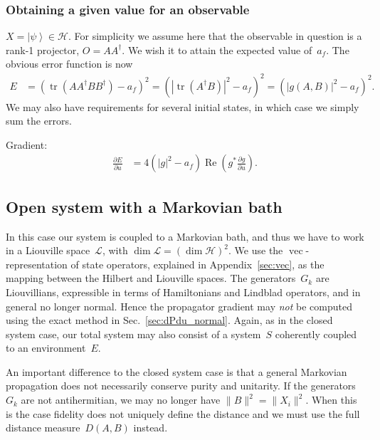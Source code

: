 \documentclass[aps, pra, a4paper, longbibliography, superscriptaddress]{revtex4-1}
\newcommand{\ket}[1]{\left| #1 \right \rangle}
\newcommand{\hilb}[1]{\mathcal{#1}}
\DeclareMathOperator{\tr}{tr}
\DeclareMathOperator{\re}{Re}
\DeclareMathOperator{\cvec}{vec}
\newcommand{\dd}[2]{\frac{\partial #1}{\partial #2}}
\begin{document}
\subsubsection{Obtaining a given value for an observable}

$X = \ket{\psi} \in \hilb{H}$.
For simplicity we assume here that the observable in question is a rank-1 projector,
$O = A A^\dagger$. We wish it to attain the expected value of~$a_{f}$. The obvious error function is now
\begin{align}
E
&=
\left(\tr\left(A A^\dagger B B^\dagger \right) -a_{f} \right)^2
= \left(\left|\tr(A^\dagger B)\right|^2 -a_{f} \right)^2
= \left(\left|g(A, B)\right|^2 -a_{f} \right)^2.
\end{align}
We may also have requirements for several initial states, in which case we simply sum the errors.

Gradient:
\begin{align}
\dd{E}{u}
&=
4 \left(\left|g\right|^2 -a_{f} \right) \re \left(g^* \dd{g}{u}\right).
\end{align}



\subsection{Open system with a Markovian bath}

In this case our system is coupled to a Markovian bath, and thus
we have to work in a Liouville space~$\hilb{L}$,
with $\dim \hilb{L} = (\dim \hilb{H})^2$.
We use the $\cvec$-representation of state
operators, explained in Appendix~\ref{sec:vec},
as the mapping between the Hilbert and Liouville spaces.
The generators~$G_k$ are Liouvillians, expressible in terms of
Hamiltonians and Lindblad operators, and in general no longer normal.
Hence the propagator gradient may \emph{not} be computed using the exact
method in Sec.~\ref{sec:dPdu_normal}.
Again, as in the closed system case, our total system may also consist of
a system~$S$ coherently coupled to an environment~$E$.

An important difference to the closed system case is that a general Markovian propagation
does not necessarily conserve purity and unitarity.
If the generators~$G_k$ are not antihermitian, we may no longer have
$\|B\|^2 = \|X_i\|^2$. When this is the case
fidelity does not uniquely define the distance and we must use the
full distance measure~$D(A,B)$ instead.
\end{document}
